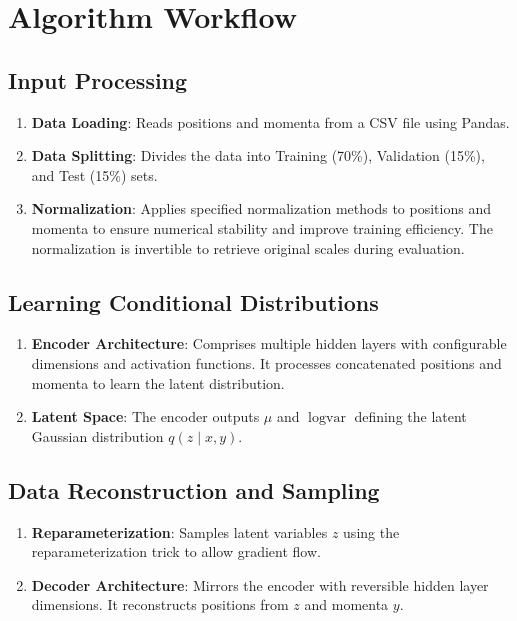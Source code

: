 \documentclass[12pt]{article}
\begin{document}
\section{Algorithm Workflow}

\subsection{Input Processing}

\begin{enumerate}[label=\alph*.]
    \item \textbf{Data Loading}: Reads positions and momenta from a CSV file using Pandas.
    \item \textbf{Data Splitting}: Divides the data into Training (70\%), Validation (15\%), and Test (15\%) sets.
    \item \textbf{Normalization}: Applies specified normalization methods to positions and momenta to ensure numerical stability and improve training efficiency. The normalization is invertible to retrieve original scales during evaluation.
\end{enumerate}

\subsection{Learning Conditional Distributions}

\begin{enumerate}[label=\alph*.]
    \item \textbf{Encoder Architecture}: Comprises multiple hidden layers with configurable dimensions and activation functions. It processes concatenated positions and momenta to learn the latent distribution.
    \item \textbf{Latent Space}: The encoder outputs \(\mu\) and \(\log \text{var}\) defining the latent Gaussian distribution \( q(z \mid x, y) \).
\end{enumerate}

\subsection{Data Reconstruction and Sampling}

\begin{enumerate}[label=\alph*.]
    \item \textbf{Reparameterization}: Samples latent variables \( z \) using the reparameterization trick to allow gradient flow.
    \item \textbf{Decoder Architecture}: Mirrors the encoder with reversible hidden layer dimensions. It reconstructs positions from \( z \) and momenta \( y \).
\end{enumerate}
\end{document}
